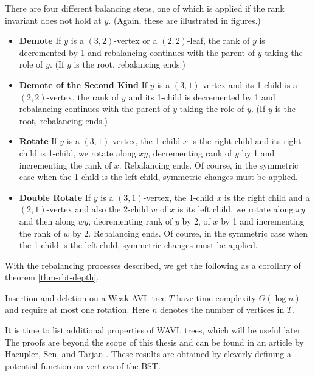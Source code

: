 There are four different balancing steps, one of which is applied if the rank invariant does not hold at $y$. (Again, these are illustrated in figures.)
\begin{itemize}
	\item \textbf{Demote} If $y$ is a $(3,2)$-vertex or a $(2,2)$-leaf, the rank of $y$ is decremented by 1 and rebalancing continues with the parent of $y$ taking the role of $y$. (If $y$ is the root, rebalancing ends.)
	\item \textbf{Demote of the Second Kind} If $y$ is a $(3,1)$-vertex and its 1-child is a $(2,2)$-vertex, the rank of $y$ and its 1-child is decremented by 1 and rebalancing continues with the parent of $y$ taking the role of $y$. (If $y$ is the root, rebalancing ends.)
	\item \textbf{Rotate} If $y$ is a $(3,1)$-vertex, the 1-child $x$ is the right child and its right child is 1-child, we rotate along $xy$, decrementing rank of $y$ by 1 and incrementing the rank of $x$. Rebalancing ends. Of course, in the symmetric case when the 1-child is the left child, symmetric changes must be applied.
	\item \textbf{Double Rotate} If $y$ is a $(3,1)$-vertex, the 1-child $x$ is the right child and a $(2,1)$-vertex and also the 2-child $w$ of $x$ is its left child, we rotate along $xy$ and then along $wy$, decrementing rank of $y$ by 2, of $x$ by 1 and incrementing the rank of $w$ by 2. Rebalancing ends. Of course, in the symmetric case when the 1-child is the left child, symmetric changes must be applied.
\end{itemize}









With the rebalancing processes described, we get the following as a corollary of theorem \ref{thm-rbt-depth}.

\begin{prop}
Insertion and deletion on a Weak AVL tree $T$ have time complexity $\Theta(\log n)$ and require at most one rotation. Here $n$ denotes the number of vertices in $T$.
\end{prop}

It is time to list additional properties of WAVL trees, which will be useful later. The proofs are beyond the scope of this thesis and can be found in an article by Haeupler, Sen, and Tarjan \cite{rank-balanced-trees}. These results are obtained by cleverly defining a potential function on vertices of the BST.

